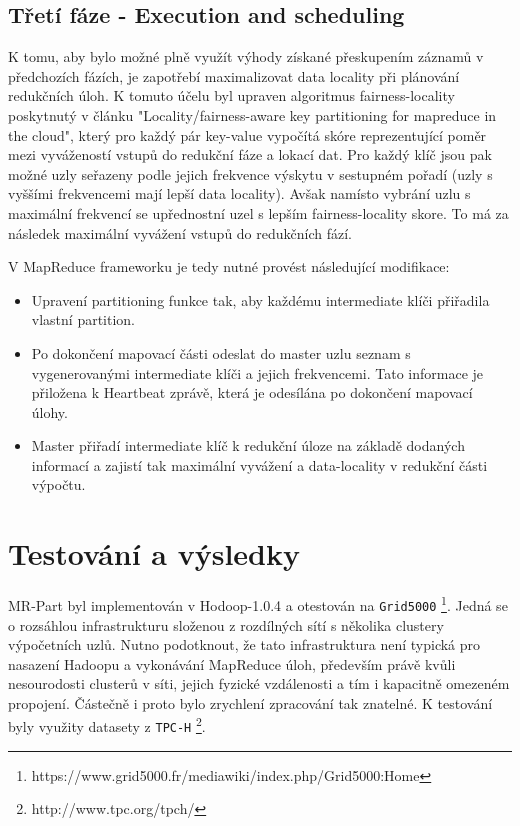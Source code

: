 \documentclass[thesis=M,czech]{FITthesis}[2012/06/26]
\begin{document}
\subsection{Třetí fáze - Execution and scheduling}
K tomu, aby bylo možné plně využít výhody získané přeskupením záznamů v předchozích fázích, je zapotřebí maximalizovat data locality při plánování redukčních úloh. K tomuto účelu byl upraven algoritmus fairness-locality poskytnutý v článku "Locality/fairness-aware key partitioning for mapreduce in the cloud"\cite{cloudcom}, který pro každý pár key-value vypočítá skóre reprezentující poměr mezi vyvážeností vstupů do redukční fáze a lokací dat. Pro každý klíč jsou pak možné uzly seřazeny podle jejich frekvence výskytu v sestupném pořadí (uzly s vyššími frekvencemi mají lepší data locality). Avšak namísto vybrání uzlu s maximální frekvencí se upřednostní uzel s lepším fairness-locality skore. To má za následek maximální vyvážení vstupů do redukčních fází.

V MapReduce frameworku je tedy nutné provést následující modifikace:

\begin{itemize}
  \item Upravení partitioning funkce tak, aby každému intermediate klíči přiřadila vlastní partition.
  \item Po dokončení mapovací části odeslat do master uzlu seznam s vygenerovanými intermediate klíči a jejich frekvencemi. Tato informace je přiložena k Heartbeat zprávě, která je odesílána po dokončení mapovací úlohy.
  \item Master přiřadí  intermediate klíč k redukční úloze na základě dodaných informací a zajistí tak maximální vyvážení a data-locality v redukční části výpočtu.
\end{itemize} 

\section{Testování a výsledky}
MR-Part byl implementován v Hodoop-1.0.4 a otestován na \texttt{Grid5000} \footnote{https://www.grid5000.fr/mediawiki/index.php/Grid5000:Home}. Jedná se o  rozsáhlou infrastrukturu složenou z rozdílných sítí s několika clustery výpočetních uzlů. Nutno podotknout, že tato infrastruktura není typická pro nasazení Hadoopu a vykonávání MapReduce úloh, především právě  kvůli nesourodosti clusterů v síti, jejich fyzické vzdálenosti a tím i kapacitně omezeném propojení. Částečně i proto bylo zrychlení zpracování tak znatelné. K testování byly využity datasety z \texttt{TPC-H} \footnote{http://www.tpc.org/tpch/}. 
\end{document}
